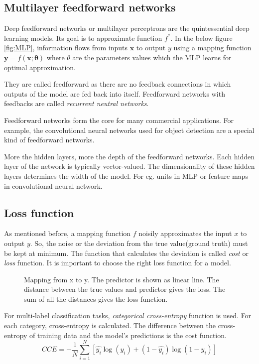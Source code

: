 \subsection{Multilayer feedforward networks}
\label{subsec:MLP}
Deep feedforward networks or multilayer perceptrons are the quintessential deep learning
models. Its goal is to approximate function $f^*$. In the below figure \ref{fig:MLP},
information flows from inputs $\mathbf{x}$ to output $y$ using a mapping function
$\mathbf{y} = f(\mathbf{x};\mathbf{\theta})$ where $\theta$ are the parameters values
which the MLP learns for optimal approximation.

They are called feedforward as there are no feedback connections in which outputs of the
model are fed back into itself. Feedforward networks with feedbacks are called
\textit{recurrent neutral networks}.

Feedforward networks form the core for many commercial applications. For example, the
convolutional neural networks used for object detection are a special kind of feedforward
networks.

More the hidden layers, more the depth of the feedforward networks. Each hidden layer of the network is typically vector-valued.
The dimensionality of these hidden layers determines the width of the model. For eg. units
in MLP or feature maps in convolutional neural network.

\subsection{Loss function}
\label{subsec:lossfunction}
As mentioned before, a mapping function $f$ noisily approximates the input $x$ to output
$y$. So, the noise or the deviation from the true value(ground truth) must be kept at
minimum. The function that calculates the deviation is called \textit{cost} or
\textit{loss} function. It is important to choose the right loss function for a model.

\begin{figure}[!h]
	\centering
    \def\svgwidth{0.6\textwidth}
    \caption{Mapping from x to y. The predictor is shown as linear line. The distance
    between the true values and predictor gives the loss. The sum of all the distances
gives the loss function.}
\label{fig:loss function}
\end{figure}

For multi-label classification tasks, \textit{categorical cross-entropy} function is used.
For each category, cross-entropy is calculated. The difference between the cross-entropy
of training data and the model's predictions is the cost function.
\begin{equation}
  CCE = -\frac{1}{N}\sum_{i = 1}^N [\hat{y_{i}}\log(y_{i})  + (1-
  \hat{y_{i}})\log(1-y_{i})]
   \label{eq:CCE}
\end{equation}


